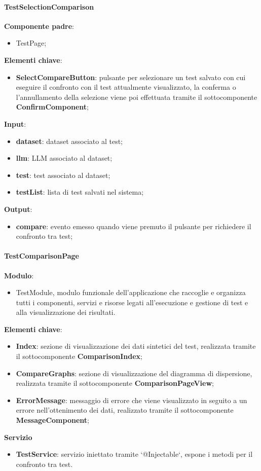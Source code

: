 \paragraph{TestSelectionComparison}
\textbf{Componente padre}:
\begin{itemize}
    \item TestPage;
\end{itemize}
\textbf{Elementi chiave}:
\begin{itemize}
    \item \textbf{SelectCompareButton}: pulsante per selezionare un test salvato con cui eseguire il confronto con il test attualmente visualizzato, la conferma o l'annullamento della selezione viene poi effettuata tramite il sottocomponente \textbf{ConfirmComponent};
\end{itemize}
    \textbf{Input}:
\begin{itemize}
    \item \textbf{dataset}: dataset associato al test;
    \item \textbf{llm}: LLM associato al dataset;
    \item \textbf{test}: test associato al dataset;
    \item \textbf{testList}: lista di test salvati nel sistema;
\end{itemize}
\textbf{Output}:
\begin{itemize}
    \item \textbf{compare}: evento emesso quando viene premuto il pulsante per richiedere il confronto tra test;
\end{itemize}
\paragraph{TestComparisonPage}  
\textbf{Modulo}:
\begin{itemize}
    \item TestModule, modulo funzionale dell'applicazione che raccoglie e organizza tutti i componenti, servizi e risorse legati all'esecuzione e gestione di test e alla visualizzazione dei risultati.    
\end{itemize}
\textbf{Elementi chiave}:
\begin{itemize}
    \item \textbf{Index}: sezione di visualizzazione dei dati sintetici del test, realizzata tramite il sottocomponente \textbf{ComparisonIndex};
    \item \textbf{CompareGraphs}: sezione di visualizzazione del diagramma di dispersione, realizzata tramite il sottocomponente \textbf{ComparisonPageView};
    \item \textbf{ErrorMessage}: messaggio di errore che viene visualizzato in seguito a un errore nell'ottenimento dei dati, realizzato tramite il sottocomponente \textbf{MessageComponent};
\end{itemize}
\textbf{Servizio}
\begin{itemize}
    \item \textbf{TestService}: servizio iniettato tramite `@Injectable`, espone i metodi per il confronto tra test.
\end{itemize}
